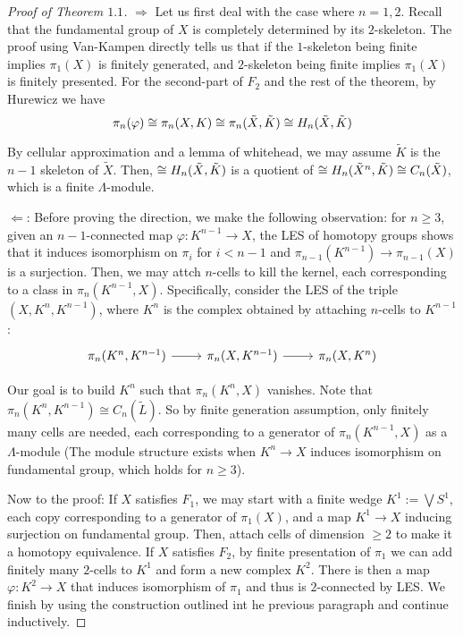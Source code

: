 \documentclass{article}
\theoremstyle{definition}
\theoremstyle{definition}
\theoremstyle{definition}
\theoremstyle{definition}
\theoremstyle{definition}
\theoremstyle{definition}
\theoremstyle{definition}
\begin{document}
\begin{proof}[Proof of Theorem $1.1$]
$\Rightarrow$    Let us first deal with the case where $n=1,2$. Recall that the fundamental group of $X$ is completely determined by its $2$-skeleton. The proof using Van-Kampen directly tells us that if the $1$-skeleton being finite implies $\pi_1(X)$ is finitely generated, and $2$-skeleton being finite implies $\pi_1(X)$ is finitely presented. For the second-part of $F_2$ and the rest of the theorem, by Hurewicz we have 
\[\pi_n(\varphi)\cong \pi_n(X,K)\cong \pi_n(\tilde{X},\Tilde{K})\cong H_n(\tilde{X},\Tilde{K})\]

By cellular approximation and a lemma of whitehead, we may assume $\tilde{K}$ is the $n-1$ skeleton of $\tilde{X}$. Then, $\cong H_n(\tilde{X},\Tilde{K})$ is a quotient of $\cong H_n(\tilde{X}^n,\Tilde{K})\cong C_n(\tilde{X})$, which is a finite $\Lambda$-module.

$\Leftarrow$: Before proving the direction, we make the following observation: for $n\geq 3$, given an $n-1$-connected map $\varphi: K^{n-1}\to X$, the LES of homotopy groups shows that it induces isomorphism on $\pi_i$ for $i< n-1$ and $\pi_{n-1}(K^{n-1})\to \pi_{n-1}(X)$ is a surjection. Then, we may attch $n$-cells to kill the kernel, each corresponding to a class in $\pi_n(K^{n-1},X)$. Specifically, consider the LES of the triple $(X,K^n,K^{n-1})$, where $K^{n}$ is the complex obtained by attaching $n$-cells to $K^{n-1}$:
\[\begin{tikzcd}
\pi_n(K^n,K^{n-1})\arrow[r]&\pi_n(X,K^{n-1})\arrow[r]&\pi_n(X,K^n)
\end{tikzcd}\]

Our goal is to build $K^n$ such that $\pi_n(K^n,X)$ vanishes. Note that $\pi_n(K^n,K^{n-1})\cong C_n(\tilde{L})$. So by finite generation assumption, only finitely many cells are needed, each corresponding to a generator of $\pi_n(K^{n-1},X)$ as a $\Lambda$-module (The module structure exists when $K^n\to X$ induces isomorphism on fundamental group, which holds for $n\geq 3$).

Now to the proof: If $X$ satisfies $F_1$, we may start with a finite wedge $K^1:=\bigvee S^1$, each copy corresponding to a generator of $\pi_1(X)$, and a map $K^1\to X$ inducing surjection on fundamental group. Then, attach cells of dimension $\geq 2$ to make it a homotopy equivalence. If $X$ satisfies $F_2$, by finite presentation of $\pi_1$ we can add finitely many $2$-cells to $K^1$ and form a new complex $K^2$. There is then a map $\varphi: K^2\to X$ that induces isomorphism of $\pi_1$ and thus is $2$-connected by LES.
We finish by using the construction outlined int he previous paragraph and continue inductively.


\end{proof}
\end{document}
